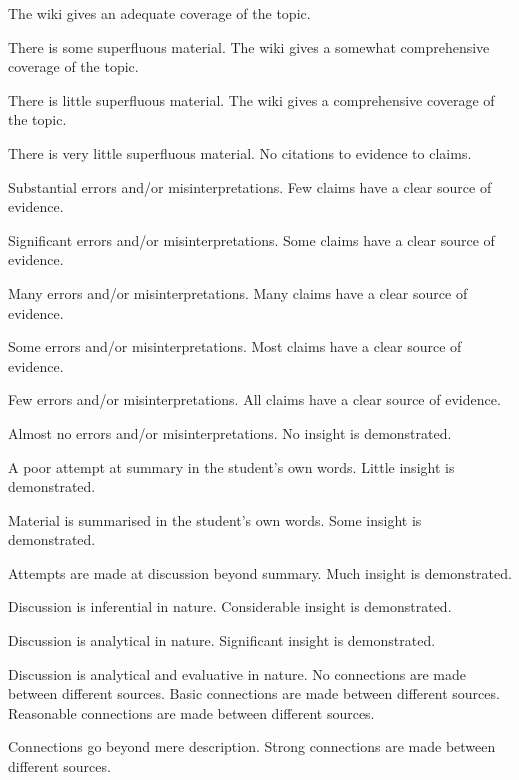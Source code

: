 \documentclass{../../fal_assignment}
\begin{document}
\begin{markingrubric}
		\grade 		The wiki gives an adequate coverage of the topic.
		\par			There is some superfluous material.
		\grade 		The wiki gives a somewhat comprehensive coverage of the topic.
		\par			There is little superfluous material.
		\grade 		The wiki gives a comprehensive coverage of the topic.
		\par			There is very little superfluous material.
		\grade\fail 	No citations to evidence to claims.
		\par 		Substantial errors and/or misinterpretations.
		\grade 		Few claims have a clear source of evidence.
		\par 		Significant errors and/or misinterpretations.
		\grade 		Some claims have a clear source of evidence.
		\par 		Many errors and/or misinterpretations.
		\grade 		Many claims have a clear source of evidence.
		\par 		Some errors and/or misinterpretations.
		\grade 		Most claims have a clear source of evidence.
		\par 		Few errors and/or misinterpretations.
		\grade 		All claims have a clear source of evidence.
		\par 		Almost no errors and/or misinterpretations.
		\grade\fail No insight is demonstrated.
		\par		A poor attempt at summary in the student's own words.
		\grade		Little insight is demonstrated.
		\par		Material is summarised in the student's own words.
		\grade		Some insight is demonstrated.
		\par		Attempts are made at discussion beyond summary.
		\grade		Much insight is demonstrated.
		\par		Discussion is inferential in nature.
		\grade		Considerable insight is demonstrated.
		\par		Discussion is analytical in nature.
		\grade		Significant insight is demonstrated.
		\par		Discussion is analytical and evaluative in nature.
		\grade\fail No connections are made between different sources.
		\grade		Basic connections are made between different sources.
		\grade		Reasonable connections are made between different sources.
		\par		Connections go beyond mere description.
		\grade		Strong connections are made between different sources.

\end{markingrubric}
\end{document}
